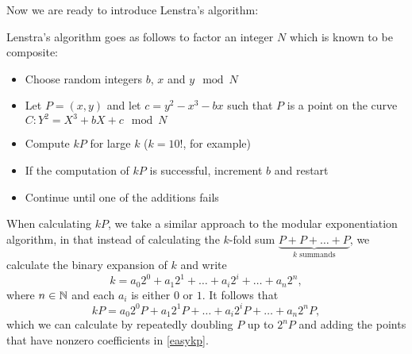 Now we are ready to introduce Lenstra's algorithm:
\begin{definition}
	Lenstra's algorithm goes as follows to factor an integer $N$ which is known to be composite:
	\begin{itemize}
		\item Choose random integers $b$, $x$ and $y \mod N$
		\item Let $P = (x,y)$ and let $c = y^2 - x^3 - bx$ such that $P$ is a point on the curve $C: Y^2 = X^3 +bX + c \mod N$
		\item Compute $kP$ for large $k$ ($k=10!$, for example)
		\item If the computation of $kP$ is successful, increment $b$ and restart
		\item Continue until one of the additions fails
	\end{itemize}
\end{definition}
When calculating $kP$, we take a similar approach to the modular exponentiation algorithm, in that instead of calculating the $k$-fold sum $\underbrace{P+P+\ldots+P}_{k\text{ summands}}$, we calculate the binary expansion of $k$ and write
$$k = a_0 2^0 + a_1 2^1 + \ldots + a_i 2^i + \ldots + a_n 2^n,$$
where $n\in\mathbb{N}$ and each $a_i$ is either $0$ or $1$. It follows that
\begin{equation}
kP = a_0 2^0 P + a_1 2^1 P + \ldots + a_i 2^i P + \ldots + a_n 2^n P,
\label{easykp}
\end{equation}
which we can calculate by repeatedly doubling $P$ up to $2^n P$ and adding the points that have nonzero coefficients in \cref{easykp}.

